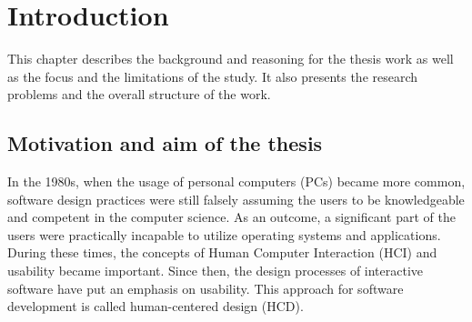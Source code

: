 \documentclass[12pt,a4paper,oneside,pdftex]{report}
\begin{document}


\label{pages-prelude}
\cleardoublepage

\startfirstchapter

\pagestyle{headings}


% 

\chapter{Introduction}
\label{chapter:introduction}
This chapter describes the background and reasoning for the thesis work as well as the focus and the limitations of the study. It also presents the research problems and the overall structure of the work. 

\section{Motivation and aim of the thesis}
\label{sec:motivationandaim}
In the 1980s, when the usage of personal computers (PCs) became more common, software design practices were still falsely assuming the users to be knowledgeable and competent in the computer science. As an outcome, a significant part of the users were practically incapable to utilize operating systems and applications. During these times, the concepts of Human Computer Interaction (HCI) and usability became important. Since then, the design processes of interactive software have put an emphasis on usability. This approach for software development is called human-centered design (HCD). \citep{RefWorks:9}
\end{document}
